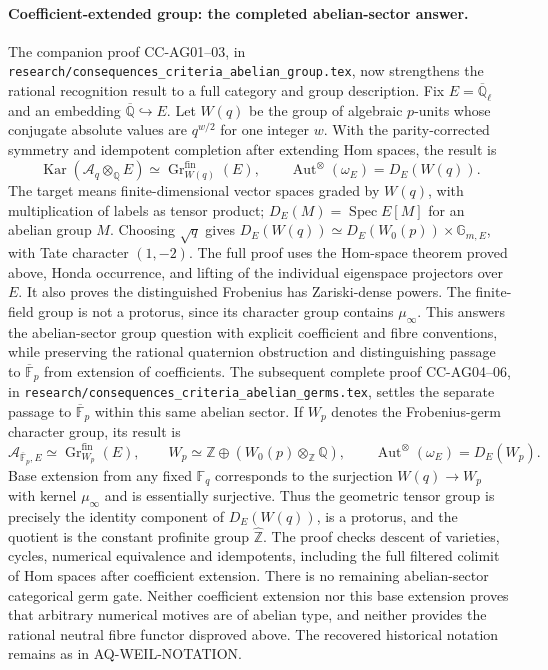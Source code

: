 \documentclass[11pt,a4paper]{article}
\theoremstyle{definition}\newtheorem{definition}[theorem]{Definition}
\theoremstyle{remark}\newtheorem{remark}[theorem]{Remark}
\begin{document}
\paragraph{Coefficient-extended group: the completed abelian-sector answer.}
The companion proof CC-AG01--03, in
\texttt{research/consequences\_criteria\_abelian\_group.tex},
now strengthens the rational recognition result to a full
category and group description. Fix
$E=\overline{\mathbb Q}_\ell$ and an embedding
$\overline{\mathbb Q}\hookrightarrow E$. Let $W(q)$ be the
group of algebraic $p$-units whose conjugate absolute values
are $q^{w/2}$ for one integer $w$. With the parity-corrected
symmetry and idempotent completion after extending Hom spaces,
the result is
\[
 \operatorname{Kar}(\mathcal A_q\otimes_{\mathbb Q}E)
  \simeq \operatorname{Gr}^{\mathrm{fin}}_{W(q)}(E),\qquad
 \operatorname{Aut}^{\otimes}(\omega_E)=D_E(W(q)).
\]
The target means finite-dimensional vector spaces graded by
$W(q)$, with multiplication of labels as tensor product;
$D_E(M)=\operatorname{Spec}E[M]$ for an abelian group $M$.
Choosing $\sqrt q$ gives
$D_E(W(q))\simeq D_E(W_0(p))\times\mathbb G_{m,E}$,
with Tate character $(1,-2)$. The full proof uses the
Hom-space theorem proved above, Honda occurrence, and
lifting of the individual eigenspace projectors over $E$.
It also proves the distinguished Frobenius has Zariski-dense
powers. The finite-field group is not a protorus, since its
character group contains $\mu_\infty$. This answers the
abelian-sector group question with explicit coefficient and
fibre conventions, while preserving the rational quaternion
obstruction and distinguishing passage to
$\overline{\mathbb F}_p$ from extension of coefficients.
The subsequent complete proof CC-AG04--06, in
\texttt{research/consequences\_criteria\_abelian\_germs.tex},
settles the separate passage to $\overline{\mathbb F}_p$
within this same abelian sector. If $W_p$ denotes the
Frobenius-germ character group, its result is
\[
 \mathcal A_{\overline{\mathbb F}_p,E}
  \simeq\operatorname{Gr}^{\mathrm{fin}}_{W_p}(E),\qquad
 W_p\simeq\mathbb Z\oplus(W_0(p)\otimes_{\mathbb Z}\mathbb Q),
 \qquad\operatorname{Aut}^{\otimes}(\omega_E)=D_E(W_p).
\]
Base extension from any fixed $\mathbb F_q$ corresponds to the
surjection $W(q)\to W_p$ with kernel $\mu_\infty$ and is
essentially surjective. Thus the geometric tensor group is
precisely the identity component of $D_E(W(q))$, is a protorus,
and the quotient is the constant profinite group
$\widehat{\mathbb Z}$. The proof checks descent of varieties,
cycles, numerical equivalence and idempotents, including the
full filtered colimit of Hom spaces after coefficient extension.
There is no remaining abelian-sector categorical germ gate.
Neither coefficient extension nor this base extension proves
that arbitrary numerical motives are of abelian type, and
neither provides the rational neutral fibre functor disproved
above. The recovered historical notation remains as in
AQ-WEIL-NOTATION.
\end{document}
